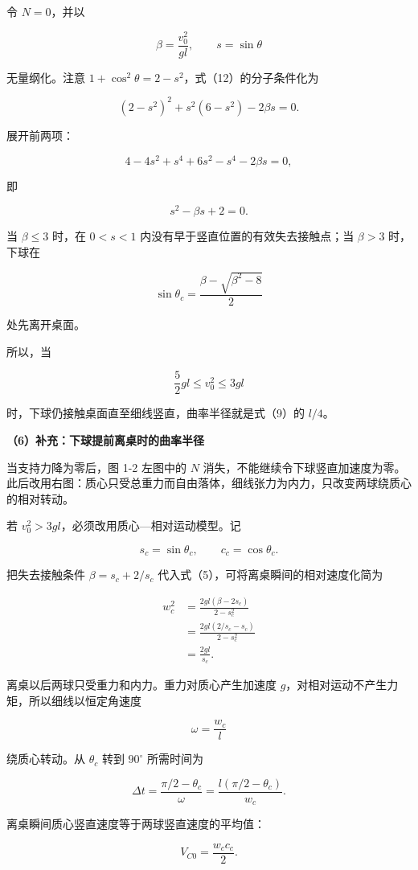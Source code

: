 \documentclass[12pt,a4paper,UTF8]{ctexart}
\begin{document}
令 \(N=0\)，并以

\[
\beta=\frac{v_0^2}{gl},\qquad s=\sin\theta
\]

无量纲化。注意 \(1+\cos^2\theta=2-s^2\)，式（12）的分子条件化为

\[
(2-s^2)^2+s^2(6-s^2)-2\beta s=0.
\]

展开前两项：

\[
4-4s^2+s^4+6s^2-s^4-2\beta s=0,
\]

即

\[
s^2-\beta s+2=0.
\tag{13}
\]

当 \(\beta\leq3\) 时，在 \(0<s<1\)
内没有早于竖直位置的有效失去接触点；当 \(\beta>3\) 时，下球在

\[
\sin\theta_c
=\frac{\beta-\sqrt{\beta^2-8}}{2}
\tag{14}
\]

处先离开桌面。

所以，当

\[
\frac52gl\leq v_0^2\leq3gl
\]

时，下球仍接触桌面直至细线竖直，曲率半径就是式（9）的 \(l/4\)。

\textbf{（6）补充：下球提前离桌时的曲率半径}

当支持力降为零后，图 1-2 左图中的 \(N\)
消失，不能继续令下球竖直加速度为零。此后改用右图：质心只受总重力而自由落体，细线张力为内力，只改变两球绕质心的相对转动。

若 \(v_0^2>3gl\)，必须改用质心---相对运动模型。记

\[
s_c=\sin\theta_c,\qquad c_c=\cos\theta_c.
\]

把失去接触条件 \(\beta=s_c+2/s_c\)
代入式（5），可将离桌瞬间的相对速度化简为

\[
\begin{aligned}
w_c^2
&=\frac{2gl(\beta-2s_c)}{2-s_c^2}\\
&=\frac{2gl(2/s_c-s_c)}{2-s_c^2}\\
&=\frac{2gl}{s_c}.
\end{aligned}
\tag{15}
\]

离桌以后两球只受重力和内力。重力对质心产生加速度
\(g\)，对相对运动不产生力矩，所以细线以恒定角速度

\[
\omega=\frac{w_c}{l}
\]

绕质心转动。从 \(\theta_c\) 转到 \(90^\circ\) 所需时间为

\[
\Delta t=\frac{\pi/2-\theta_c}{\omega}
=\frac{l(\pi/2-\theta_c)}{w_c}.
\tag{16}
\]

离桌瞬间质心竖直速度等于两球竖直速度的平均值：

\[
V_{C0}=\frac{w_c c_c}{2}.
\]
\end{document}
